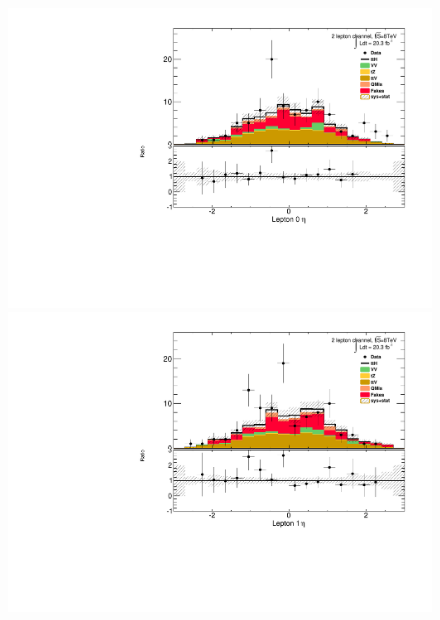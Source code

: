 \begin{figure}[!htbp]
\begin{minipage}[h]{0.5\textwidth}
  \end{minipage}\hfill
  \begin{minipage}[h]{0.5\textwidth}
    \centering \includegraphics[width=\textwidth]{figs/results/plotCand_2lep_Lep0Eta}
  \end{minipage}\hfill
  \begin{minipage}[h]{0.5\textwidth}
    \centering \includegraphics[width=\textwidth]{figs/results/plotCand_2lep_Lep1Eta}
  \end{minipage}\hfill
  \begin{minipage}[h]{0.5\textwidth}

\end{minipage}
\end{figure}

